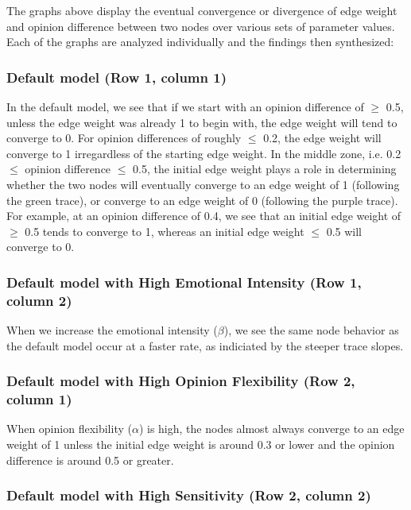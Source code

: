 \documentclass[11pt]{article}
\begin{document}
The graphs above display the eventual convergence or divergence of edge
weight and opinion difference between two nodes over various sets of
parameter values. Each of the graphs are analyzed individually and the
findings then synthesized:

    \subsubsection*{Default model (Row 1, column 1)}

In the default model, we see that if we start with an opinion difference
of \(\geq\) 0.5, unless the edge weight was already 1 to begin with, the
edge weight will tend to converge to 0. For opinion differences of
roughly \(\leq\) 0.2, the edge weight will converge to 1 irregardless of
the starting edge weight. In the middle zone, i.e. 0.2 \(\leq\) opinion
difference \(\leq\) 0.5, the initial edge weight plays a role in
determining whether the two nodes will eventually converge to an edge
weight of 1 (following the green trace), or converge to an edge weight
of 0 (following the purple trace). For example, at an opinion difference
of 0.4, we see that an initial edge weight of \(\geq\) 0.5 tends to
converge to 1, whereas an initial edge weight \(\leq\) 0.5 will converge
to 0.

 \subsubsection*{Default model with High Emotional Intensity (Row 1, column 2)}

When we increase the emotional intensity (\(\beta\)), we see the same
node behavior as the default model occur at a faster rate, as indiciated
by the steeper trace slopes.

 \subsubsection*{Default model with High Opinion Flexibility (Row 2, column 1)}

When opinion flexibility (\(\alpha\)) is high, the nodes almost always
converge to an edge weight of 1 unless the initial edge weight is around
0.3 or lower and the opinion difference is around 0.5 or greater.

 \subsubsection*{Default model with High Sensitivity (Row 2, column 2)}
\end{document}
